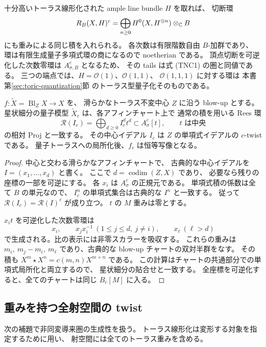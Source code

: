 十分高いトーラス線形化された ample line bundle $H$ を取れば、
切断環
\[
 R_B(X,H)^c
 =\bigoplus_{n\geq0}H^0(X,H^{\otimes n})\otimes_\mathbb C B
\]
にも重みによる同じ積を入れられる。
各次数は有限階数自由 $B$-加群であり、
環は有限生成量子多項式環の商になるので noetherian である。
頂点切断を可逆化した次数零環は $A_{\sigma,B}^c$ となるため、
その tails は式 (TNC1) の圏と同値である。
三つの端点では、$H=\mathcal O(1)$、$\mathcal O(1,1)$、
$\mathcal O(1,1,1)$ に対する環は
本書第\ref{sec:toric-quantization}節 のトーラス型量子化そのものである。

\begin{lemma}\label{lem:toric-twisted-rees}
$f:\widetilde X=\operatorname{Bl}_Z X\to X$ を、
滑らかなトーラス不変中心 $Z$ に沿う blow-up とする。
星状細分の量子模型 $\widetilde X_c$ は、各アフィンチャート上で
通常の積を用いる Rees 環
\[
 \mathcal R(I_c)=\bigoplus_{d\geq0}I_c^d t^d
 \subset A_\sigma^c[t],
 \qquad t\text{ は中央}
 \tag{TNC2}
\]
の相対 Proj と一致する。
その中心イデアル $I_c$ は $Z$ の単項式イデアルの $c$-twist である。
量子トーラスへの局所化後、$f_c$ は恒等写像となる。
\end{lemma}
\begin{proof}
中心と交わる滑らかなアフィンチャートで、
古典的な中心イデアルを $I=(x_1,\ldots,x_d)$ と書く。
ここで $d=\operatorname{codim}(Z,X)$ であり、
必要なら残りの座標の一部を可逆にする。
各 $x_i$ は $A_\sigma^c$ の正規元である。
単項式積の係数は全て $B$ の単元なので、
$I_c^n$ の単項式集合は古典的な $I^n$ と一致する。
従って $\mathcal R(I_c)=\mathcal R(I)^c$ が成り立つ。
$t$ の $M$ 重みは零とする。

$x_i t$ を可逆化した次数零環は
\[
 x_i,\qquad x_jx_i^{-1}\ (1\leq j\leq d,\ j\ne i),
 \qquad x_\ell\ (\ell>d)
 \tag{TNC3}
\]
で生成される。比の表示には非零スカラーを吸収する。
これらの重みは
$m_i,\ m_j-m_i,\ m_\ell$ であり、古典的な blow-up チャートの双対半群をなす。
その積も $X^m\star X^n=c(m,n)X^{m+n}$ である。
この計算はチャートの共通部分での単項式局所化と両立するので、
星状細分の貼合せと一致する。
全座標を可逆化すると、全てのチャートは同じ $B_c[M]$ に入る。
\end{proof}

\subsection{重みを持つ全射空間の twist}

次の補題で非同変導来圏の生成性を扱う。
トーラス線形化は変形する対象を指定するために用い、
射空間には全てのトーラス重みを含める。

